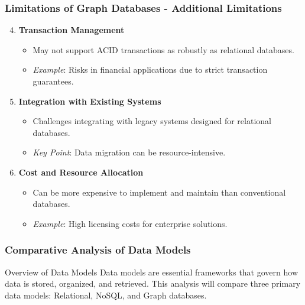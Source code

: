\documentclass[aspectratio=169]{beamer}
\begin{document}
\begin{frame}[fragile]
    \frametitle{Limitations of Graph Databases - Additional Limitations}
    \begin{enumerate}
        \setcounter{enumi}{3}
        \item \textbf{Transaction Management}
        \begin{itemize}
            \item May not support ACID transactions as robustly as relational databases.
            \item \textit{Example}: Risks in financial applications due to strict transaction guarantees.
        \end{itemize}

        \item \textbf{Integration with Existing Systems}
        \begin{itemize}
            \item Challenges integrating with legacy systems designed for relational databases.
            \item \textit{Key Point}: Data migration can be resource-intensive.
        \end{itemize}

        \item \textbf{Cost and Resource Allocation}
        \begin{itemize}
            \item Can be more expensive to implement and maintain than conventional databases.
            \item \textit{Example}: High licensing costs for enterprise solutions.
        \end{itemize}
    \end{enumerate}
\end{frame}

\begin{frame}[fragile]
    \frametitle{Comparative Analysis of Data Models}
    \begin{block}{Overview of Data Models}
        Data models are essential frameworks that govern how data is stored, organized, and retrieved. 
        This analysis will compare three primary data models: Relational, NoSQL, and Graph databases.
    \end{block}
\end{frame}
\end{document}
